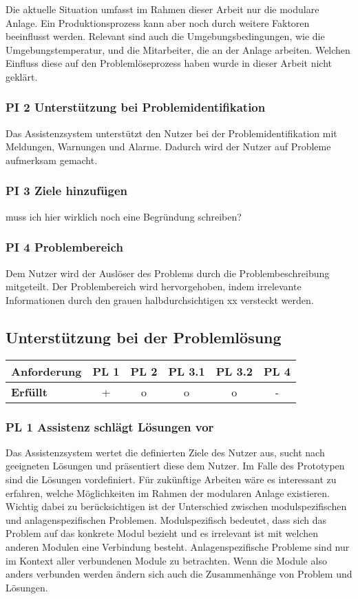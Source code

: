 Die aktuelle Situation umfasst im Rahmen dieser Arbeit nur die modulare Anlage. Ein Produktionsprozess kann aber noch durch weitere Faktoren beeinflusst werden. Relevant sind auch die Umgebungsbedingungen, wie die Umgebungstemperatur, und die Mitarbeiter, die an der Anlage arbeiten. Welchen Einfluss diese auf den Problemlöseprozess haben wurde in dieser Arbeit nicht geklärt.

\subsubsection*{PI 2 Unterstützung bei Problemidentifikation}
Das Assistenzsystem unterstützt den Nutzer bei der Problemidentifikation mit Meldungen, Warnungen und Alarme. Dadurch wird der Nutzer auf Probleme aufmerksam gemacht.

\subsubsection*{PI 3 Ziele hinzufügen}
muss ich hier wirklich noch eine Begründung schreiben?

\subsubsection*{PI 4 Problembereich}
Dem Nutzer wird der Auslöser des Problems durch die Problembeschreibung mitgeteilt. Der Problembereich wird hervorgehoben, indem irrelevante Informationen durch den grauen halbdurchsichtigen xx versteckt werden.

\subsection{Unterstützung bei der Problemlösung}
\begin{table}[htbp]
\centering
\begin{tabular}{l|c|c|c|c|c}
\textbf{Anforderung} & PL 1 & PL 2 & PL 3.1 & PL 3.2 & PL 4 \\
\hline
\textbf{Erfüllt} & + & o & o & o & - \\
\end{tabular}
\label{Auswertung Anforderungen Problemlösung}
\end{table}

\subsubsection*{PL 1 Assistenz schlägt Lösungen vor}
Das Assistenzsystem wertet die definierten Ziele des Nutzer aus, sucht nach geeigneten Lösungen und präsentiert diese dem Nutzer. Im Falle des Prototypen sind die Lösungen vordefiniert. Für zukünftige Arbeiten wäre es interessant zu erfahren, welche Möglichkeiten im Rahmen der modularen Anlage existieren. Wichtig dabei zu berücksichtigen ist der Unterschied zwischen modulspezifischen und anlagenspezifischen Problemen. Modulspezifisch bedeutet, dass sich das Problem auf das konkrete Modul bezieht und es irrelevant ist mit welchen anderen Modulen eine Verbindung besteht. Anlagenspezifische Probleme sind nur im Kontext aller verbundenen Module zu betrachten. Wenn die Module also anders verbunden werden ändern sich auch die Zusammenhänge von Problem und Lösungen.

